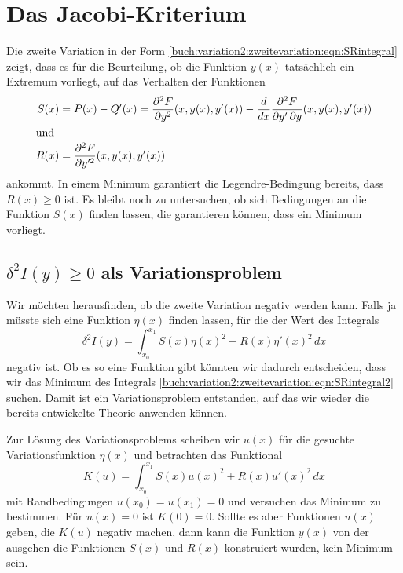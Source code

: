 %
%
%
\section{Das Jacobi-Kriterium
\label{buch:variation2:section:jacobi}}
Die zweite Variation in der Form
\eqref{buch:variation2:zweitevariation:eqn:SRintegral}
zeigt, dass es für die Beurteilung, ob die Funktion $y(x)$ tatsächlich
ein Extremum vorliegt, auf das Verhalten der Funktionen
\begin{align*}
S(x)
&=
P(x) - Q'(x)
=
\frac{\partial^2F}{\partial y^2}(x,y(x),y'(x))
-
\frac{d}{dx}\frac{\partial^2 F}{\partial y'\,\partial y}(x,y(x),y'(x))
\\
\intertext{und}
R(x)
&=
\frac{\partial^2F}{\partial y^{\prime2}}(x,y(x),y'(x))
\end{align*}
ankommt.
In einem Minimum garantiert die Legendre-Bedingung bereits,
dass $R(x)\ge 0$ ist.
Es bleibt noch zu untersuchen, ob sich Bedingungen an die Funktion
$S(x)$ finden lassen, die garantieren können, dass ein Minimum
vorliegt.

%
%
\subsection{$\delta^2 I(y)\ge 0$ als Variationsproblem
\label{buch:variation2:jacobi:subsection:delta2I}}
Wir möchten herausfinden, ob die zweite Variation negativ werden kann.
Falls ja müsste sich eine Funktion $\eta(x)$ finden lassen, für die
der Wert des Integrals
\begin{equation}
\delta^2 I(y)
=
\int_{x_0}^{x_1}
S(x)\eta(x)^2 + R(x)\eta'(x)^2
\,dx
\label{buch:variation2:zweitevariation:eqn:SRintegral2}
\end{equation}
negativ ist.
Ob es so eine Funktion gibt könnten wir dadurch entscheiden, dass wir
das Minimum des Integrals
\eqref{buch:variation2:zweitevariation:eqn:SRintegral2}
suchen.
Damit ist ein Variationsproblem entstanden, auf das wir wieder die
bereits entwickelte Theorie anwenden können.

Zur Lösung des Variationsproblems scheiben wir $u(x)$ für die gesuchte
Variationsfunktion $\eta(x)$ und betrachten das Funktional
\begin{equation}
K(u)
=
\int_{x_0}^{x_1}
S(x) u(x)^2 + R(x) u'(x)^2
\,dx
\label{buch:variation2:jacobi:eqn:K}
\end{equation}
mit Randbedingungen $u(x_0)=u(x_1)=0$ und versuchen das Minimum
zu bestimmen.
Für $u(x)=0$ ist $K(0)=0$.
Sollte es aber Funktionen $u(x)$ geben, die $K(u)$ negativ machen,
dann kann die Funktion $y(x)$ von der ausgehen die Funktionen $S(x)$
und $R(x)$ konstruiert wurden, kein Minimum sein.

